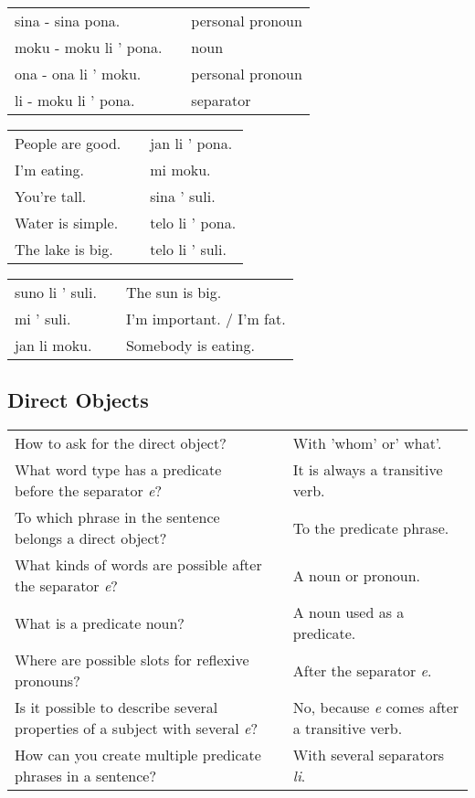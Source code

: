 \begin{supertabular}{p{5,5cm}|ll}
sina - sina pona. && personal pronoun \\ %
moku - moku li ' pona. && noun \\ %
ona - ona li ' moku. && personal pronoun \\ %
li - moku li ' pona. && separator \\ %
\end{supertabular}

\begin{supertabular}{p{5,5cm}|ll}
People are good. && jan li ' pona. \\ %
I'm eating. && mi moku. \\ %
You're tall. && sina ' suli. \\ %
Water is simple. && telo li ' pona. \\ %
The lake is big. && telo li ' suli. \\ %
\end{supertabular}  

\begin{supertabular}{p{5,5cm}|ll}
suno li ' suli. && The sun is big. \\
mi ' suli. && I'm important. / I'm fat. \\
jan li moku. && Somebody is eating. \\
\end{supertabular} 

\newpage
%
\subsection*{Direct Objects} 
\label{'direct_objects_compund_sentences'}
%
\begin{supertabular}{p{5,5cm}|ll}
How to ask for the direct object? && With 'whom' or' what'. \\ %
What word type has a predicate before the separator \textit{e}?  && It is always a transitive verb. \\ %
To which phrase in the sentence belongs a direct object? && To the predicate phrase. \\ %
What kinds of words are possible after the separator \textit{e}?  && A noun or pronoun. \\ %
What is a predicate noun?  && A noun used as a predicate. \\ %
Where are possible slots for reflexive pronouns? && After the separator \textit{e}. \\ %
Is it possible to describe several properties of a subject with several \textit{e}? && No, because \textit{e} comes after a transitive verb. \\ %
How can you create multiple predicate phrases in a sentence?  && With several separators \textit{li}. \\ %
\end{supertabular} 

